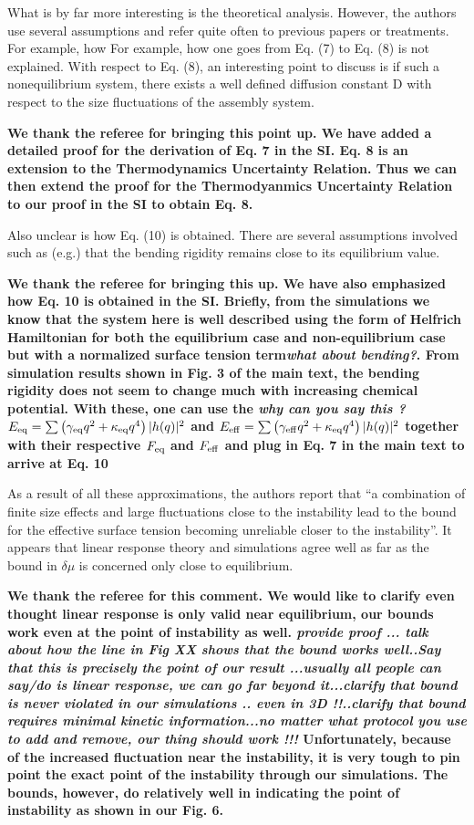 \documentclass{letter}
\begin{document}
\begin{letter}{}
What is by far more interesting is the theoretical analysis. 
However, the authors use several assumptions and refer quite often to 
previous papers or treatments. For example, how For example, how one 
goes from Eq. (7) to Eq. (8) is not explained. With respect to Eq. 
(8), an interesting point to discuss is if such a nonequilibrium 
system, there exists a well defined diffusion constant D with respect 
to the size fluctuations of the assembly system.

{\bf We thank the referee for bringing this point up.  We have added a detailed proof for the derivation of Eq. 7 in the SI. Eq. 8 is an extension to the Thermodynamics Uncertainty Relation. Thus we can then extend the proof for the Thermodyanmics Uncertainty Relation to our proof in the SI to obtain Eq. 8.} 

Also unclear is how Eq. (10) is obtained. There are several 
assumptions involved such as (e.g.) that the bending rigidity remains 
close to its equilibrium value. 

{\bf We thank the referee for bringing this up. We have also emphasized how Eq. 10 is obtained in the SI. Briefly, from the simulations we know that the system here is well described using the form of Helfrich Hamiltonian for both the equilibrium case and non-equilibrium case but with a normalized surface tension term{\it what about bending?}. From simulation results shown in Fig. 3 of the main text, the bending rigidity does not seem to change much with increasing chemical potential. With these, one can use the {\it why can you say this ?}$E_{\rm eq} = \sum \left ( \gamma_{\rm eq} q^2+\kappa_{\rm eq} q^4\right)|h(q)|^2$ and $E_{\rm eff} = \sum \left ( \gamma_{\rm eff} q^2+\kappa_{\rm eq} q^4\right)|h(q)|^2$ together with their respective $F_{\rm eq}$ and $F_{\rm eff}$ and plug in Eq. 7 in the main text to arrive at Eq. 10 } 

As a result of all these approximations, the authors report that “a 
combination of finite size effects and large fluctuations close to the 
instability lead to the bound for the effective surface tension 
becoming unreliable closer to the instability”. It appears that linear 
response theory and simulations agree well as far as the bound in 
$\delta\mu$ is concerned only close to equilibrium.

{\bf We thank the referee for this comment. We would like to clarify even thought linear response is only valid near equilibrium, our bounds work even at the point of instability as well. {\it provide proof ... talk about how the line in Fig XX shows that the bound works well..Say that this is precisely the point of our result ...usually all people can say/do is linear response, we can go far beyond it...clarify that bound is never violated in our simulations .. even in 3D !!..clarify that bound requires minimal kinetic information...no matter what protocol you use to add and remove, our thing should work !!! } Unfortunately, because of the increased fluctuation near the instability, it is very tough to pin point the exact point of the instability through our simulations. The bounds, however, do relatively well in indicating the point of instability as shown in our Fig. 6.  } 


\end{letter}
\end{document}
